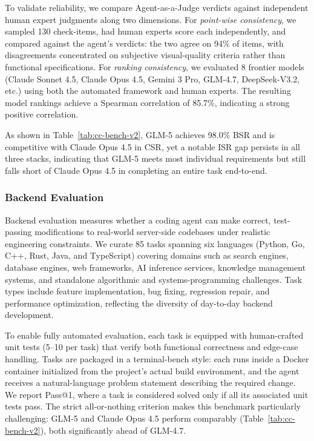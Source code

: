 To validate reliability, we compare Agent-as-a-Judge verdicts against independent human expert judgments along two dimensions. For \emph{point-wise consistency}, we sampled 130 check-items, had human experts score each independently, and compared against the agent's verdicts: the two agree on 94\% of items, with disagreements concentrated on subjective visual-quality criteria rather than functional specifications. For \emph{ranking consistency}, we evaluated 8 frontier models (Claude Sonnet 4.5, Claude Opus 4.5, Gemini 3 Pro, GLM-4.7, DeepSeek-V3.2, etc.) using both the automated framework and human experts. The resulting model rankings achieve a Spearman correlation of 85.7\%, indicating a strong positive correlation.

As shown in Table~\ref{tab:cc-bench-v2}, GLM-5 achieves 98.0\% BSR and is competitive with Claude Opus 4.5 in CSR, yet a notable ISR gap persists in all three stacks, indicating that GLM-5 meets most individual requirements but still falls short of Claude Opus 4.5 in completing an entire task end-to-end.

\subsubsection{Backend Evaluation}

Backend evaluation measures whether a coding agent can make correct, test-passing modifications to real-world server-side codebases under realistic engineering constraints. We curate 85 tasks spanning six languages (Python, Go, C++, Rust, Java, and TypeScript) covering domains such as search engines, database engines, web frameworks, AI inference services, knowledge management systems, and standalone algorithmic and systems-programming challenges. Task types include feature implementation, bug fixing, regression repair, and performance optimization, reflecting the diversity of day-to-day backend development.

To enable fully automated evaluation, each task is equipped with human-crafted unit tests (5--10 per task) that verify both functional correctness and edge-case handling. Tasks are packaged in a terminal-bench style: each runs inside a Docker container initialized from the project's actual build environment, and the agent receives a natural-language problem statement describing the required change. We report Pass@1, where a task is considered solved only if all its associated unit tests pass. The strict all-or-nothing criterion makes this benchmark particularly challenging: GLM-5 and Claude Opus 4.5 perform comparably (Table~\ref{tab:cc-bench-v2}), both significantly ahead of GLM-4.7.

